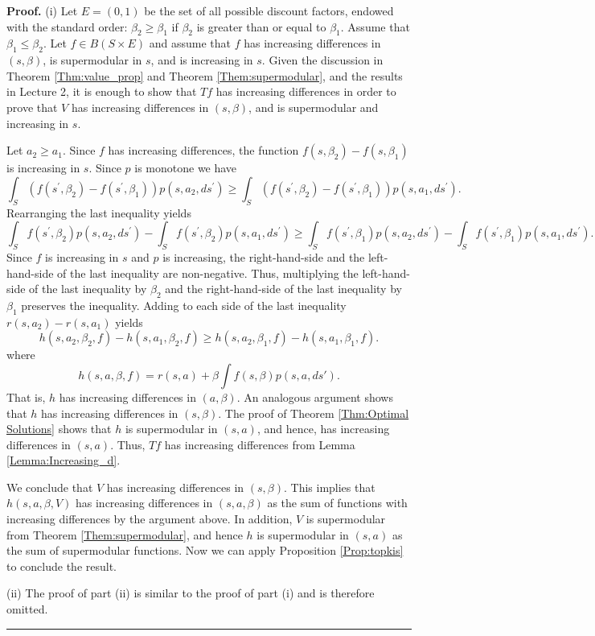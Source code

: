 \documentclass[letter,11pt]{article}
\newenvironment {proof}[1][Proof]{\noindent \textbf {#1.} }{\ \rule {0.5em}{0.5em}}
\begin{document}
\begin{proof}
(i)  Let $E =(0 ,1)$ be the set of all possible discount factors, endowed with the standard order: $\beta _{2} \geq \beta _{1}$ if $\beta _{2}$ is greater than or equal to $\beta _{1}$. Assume that $\beta _{1} \leq \beta _{2}$. Let $f \in B(S \times E)$ and assume that $f$ has increasing differences in $(s ,\beta )$, is supermodular in $s$, and is increasing in $s$. Given the discussion in Theorem \ref{Thm:value_prop} and Theorem \ref{Them:supermodular}, and the results in Lecture 2, it is enough to show that $Tf$ has increasing differences in order to prove that $V$ has increasing differences in $(s,\beta)$, and is supermodular and increasing in $s$. 

Let $a_{2} \geq a_{1}$. Since $f$ has increasing differences, the function $f(s ,\beta _{2}) -f(s ,\beta _{1})$ is increasing in $s$. Since $p$ is monotone we have\begin{equation*}\int _{S}(f(s^{ \prime } ,\beta _{2}) -f(s^{ \prime } ,\beta _{1}))p(s ,a_{2} ,ds^{ \prime }) \geq \int _{S}(f(s^{ \prime } ,\beta _{2}) -f(s^{ \prime } ,\beta _{1}))p(s ,a_{1} ,ds^{ \prime }) .
\end{equation*}Rearranging the last inequality yields \begin{equation*}\int _{S}f(s^{ \prime } ,\beta _{2})p(s ,a_{2} ,ds^{ \prime }) -\int _{S}f(s^{ \prime } ,\beta _{2})p(s ,a_{1} ,ds^{ \prime }) \geq \int _{S}f(s^{ \prime } ,\beta _{1})p(s ,a_{2} ,ds^{ \prime }) -\int _{S}f(s^{ \prime } ,\beta _{1})p(s ,a_{1} ,ds^{ \prime }) .
\end{equation*}Since $f$ is increasing in $s$ and $p$ is increasing, the right-hand-side and the left-hand-side of the last inequality are non-negative. Thus, multiplying the left-hand-side of the last inequality by $\beta _{2}$ and the right-hand-side of the last inequality by $\beta _{1}$ preserves the inequality. Adding to each side of the last inequality $r(s,a_{2}) -r(s,a_{1})$ yields \begin{equation*}h(s ,a_{2} ,\beta _{2} ,f) -h(s ,a_{1} ,\beta _{2} ,f) \geq h(s ,a_{2} ,\beta _{1} ,f) -h(s ,a_{1} ,\beta _{1} ,f) .
\end{equation*}
where 
$$h(s,a,\beta,f) = r(s,a) + \beta \int f(s,\beta) p(s,a,ds').  $$
That is, $h$ has increasing differences in $(a ,\beta )$. An analogous argument shows that $h$ has increasing differences in $(s ,\beta )$. The proof of Theorem \ref{Thm:Optimal Solutions} shows that $h$ is supermodular in $(s,a)$, and hence, has increasing differences in $(s ,a)$. Thus, $Tf$ has increasing differences from Lemma \ref{Lemma:Increasing_d}.

We conclude that $V$ has increasing differences in $(s,\beta)$. This implies that $h(s,a,\beta,V)$ has increasing differences in $(s,a,\beta)$ as the sum of functions with increasing differences by the argument above. In addition, $V$ is supermodular from Theorem \ref{Them:supermodular}, and hence $h$ is supermodular in $(s,a)$ as the sum of supermodular functions.  Now we can apply Proposition \ref{Prop:topkis} to conclude the result. 

(ii) The proof of part (ii) is similar to the proof of part (i) and is therefore omitted. 
\end{proof}
\end{document}
